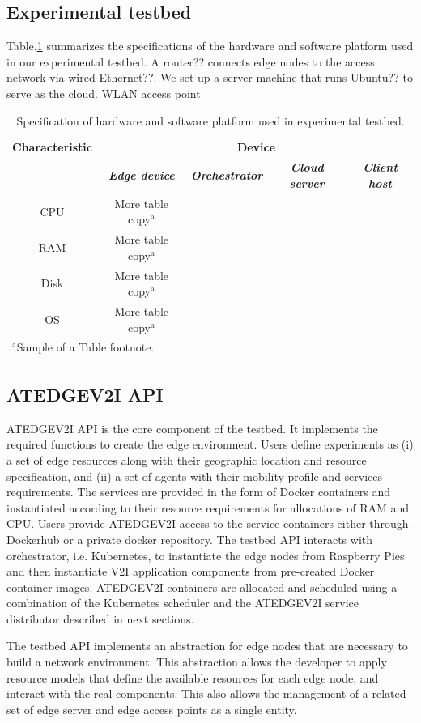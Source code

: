 \documentclass[conference]{IEEEtran}
\begin{document}
\subsection{Experimental testbed}
\par Table.\ref{tab:HW} summarizes the specifications of the hardware and software platform used in our experimental 
testbed. A router?? connects edge nodes to the access network via wired Ethernet??. 
We set up a server machine that runs Ubuntu?? to serve as the cloud. WLAN access point

\begin{table}[htbp]
\caption{Specification of hardware and software platform used in experimental testbed.}
\begin{center}
\begin{tabular}{|c|c|c|c|c|}
\hline
\textbf{Characteristic}&\multicolumn{4}{|c|}{\textbf{Device}} \\
\cline{2-5} 
\textbf{} & \textbf{\textit{Edge device}}& \textbf{\textit{Orchestrator}}& \textbf{\textit{Cloud server}}& \textbf{\textit{Client host}} \\
\hline
CPU& More table copy$^{\mathrm{a}}$& &  \\
\hline
RAM& More table copy$^{\mathrm{a}}$& &  \\
\hline
Disk& More table copy$^{\mathrm{a}}$& &  \\
\hline
OS& More table copy$^{\mathrm{a}}$& &  \\
\hline
\multicolumn{5}{l}{$^{\mathrm{a}}$Sample of a Table footnote.}
\end{tabular}
\label{tab:HW}
\end{center}
\end{table}

\subsection{ATEDGEV2I API}
\par ATEDGEV2I API is the core component of the testbed. It implements the required functions to create the edge environment. Users define experiments as (i) a set of edge resources along with their geographic location and resource specification, and (ii) a set of agents with their mobility profile and services requirements. The services are provided in the form of Docker containers and instantiated according to their resource requirements for allocations of RAM and CPU. Users provide ATEDGEV2I access to the service containers either through Dockerhub or a private docker repository. The testbed API interacts with orchestrator, i.e. Kubernetes, to instantiate the edge nodes from Raspberry Pies and then instantiate V2I application components from pre-created Docker container images. ATEDGEV2I containers are allocated and scheduled using a combination of the Kubernetes scheduler and the ATEDGEV2I service distributor described in next sections.
\par The testbed API implements an abstraction for edge nodes that are necessary to build a network environment. This abstraction allows the developer to apply resource models that define the available resources for each edge node, and interact with the real components. This also allows the management of a related set of edge server and edge access points as a single entity. 
\end{document}

